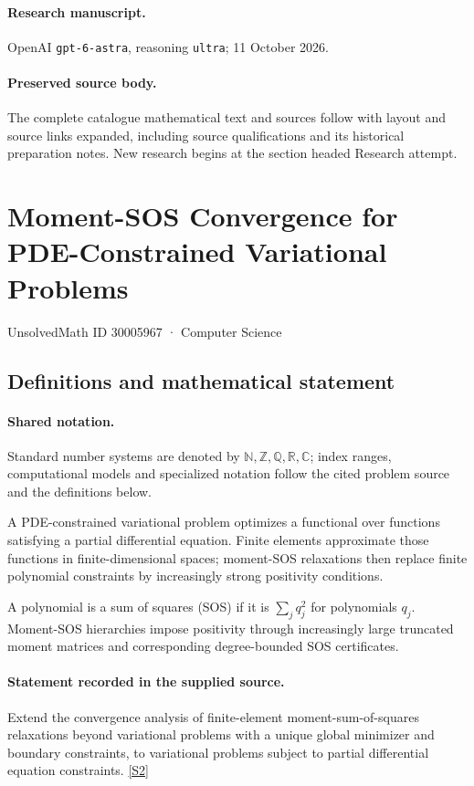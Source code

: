 \documentclass[11pt]{article}
\begin{document}
\paragraph{Research manuscript.} OpenAI \texttt{gpt-6-astra}, reasoning \texttt{ultra}; 11 October 2026.
\paragraph{Preserved source body.} The complete catalogue mathematical text and sources follow with layout and source links expanded, including source qualifications and its historical preparation notes. New research begins at the section headed Research attempt.

\section{Moment-SOS Convergence for PDE-Constrained Variational Problems}\label{30005967}
{\small UnsolvedMath ID 30005967 · Computer Science}
\subsection{Definitions and mathematical statement}

\paragraph{Shared notation.}Standard number systems are denoted by $\mathbb N,\mathbb Z,\mathbb Q,\mathbb R,\mathbb C$; index ranges, computational models and specialized notation follow the cited problem source and the definitions below.


A PDE-constrained variational problem optimizes a functional over functions satisfying a partial differential equation. Finite elements approximate those functions in finite-dimensional spaces; moment-SOS relaxations then replace finite polynomial constraints by increasingly strong positivity conditions.

A polynomial is a sum of squares (SOS) if it is $\sum_j q_j^2$ for polynomials $q_j$. Moment-SOS hierarchies impose positivity through increasingly large truncated moment matrices and corresponding degree-bounded SOS certificates.
\paragraph{Statement recorded in the supplied source.}
Extend the convergence analysis of finite-element moment-sum-of-squares relaxations beyond variational problems with a unique global minimizer and boundary constraints, to variational problems subject to partial differential equation constraints. \href{https://doi.org/10.4171/owr/2024/35}{[S2]}
\end{document}
